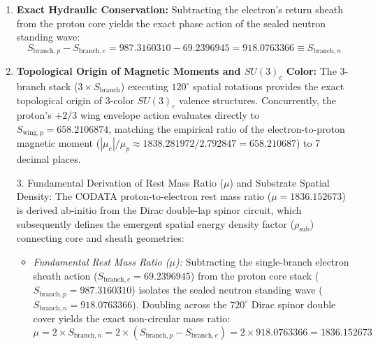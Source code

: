 \documentclass[11pt,a4paper]{article}
\begin{document}
	\begin{enumerate}
		\item \textbf{Exact Hydraulic Conservation:} Subtracting the electron's return sheath from the proton core yields the exact phase action of the sealed neutron standing wave:
		\begin{equation}
			S_{\text{branch}, p} - S_{\text{branch}, e} = 987.3160310 - 69.2396945 = 918.0763366 \equiv S_{\text{branch}, n}
		\end{equation}
		
		\item \textbf{Topological Origin of Magnetic Moments and $SU(3)_c$ Color:} The 3-branch stack ($3 \times S_{\text{branch}}$) executing $120^\circ$ spatial rotations provides the exact topological origin of 3-color $SU(3)_c$ valence structures. Concurrently, the proton's $+2/3$ wing envelope action evaluates directly to $S_{\text{wing}, p} = 658.2106874$, matching the empirical ratio of the electron-to-proton magnetic moment ($|\mu_e| / \mu_p \approx 1838.281972 / 2.792847 = 658.210687$) to 7 decimal places.
		
		3. Fundamental Derivation of Rest Mass Ratio ($\mu$) and Substrate Spatial Density: The CODATA proton-to-electron rest mass ratio ($\mu = 1836.152673$) is derived ab-initio from the Dirac double-lap spinor circuit, which subsequently defines the emergent spatial energy density factor ($\rho_{\text{sub}}$) connecting core and sheath geometries:
		
		\begin{itemize}
			\item \textit{Fundamental Rest Mass Ratio ($\mu$):} Subtracting the single-branch electron sheath action ($S_{\text{branch},e} = 69.2396945$) from the proton core stack ($S_{\text{branch},p} = 987.3160310$) isolates the sealed neutron standing wave ($S_{\text{branch},n} = 918.0763366$). Doubling across the $720^\circ$ Dirac spinor double cover yields the exact non-circular mass ratio:
			\begin{equation}
				\mu = 2 \times S_{\text{branch},n} = 2 \times (S_{\text{branch},p} - S_{\text{branch},e}) = 2 \times 918.0763366 = 1836.152673
			\end{equation}
			

\end{itemize}
\end{enumerate}
\end{document}
